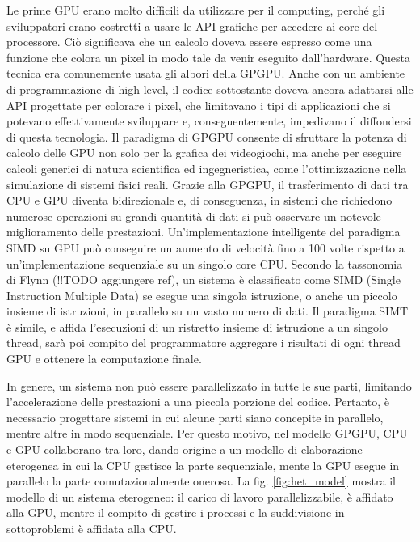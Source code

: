 Le prime GPU erano molto difficili da utilizzare per il computing, perché gli sviluppatori erano costretti a usare le API grafiche per accedere ai core del processore. Ciò significava che un calcolo doveva essere espresso come una funzione che colora un pixel in modo tale da venir eseguito dall'hardware. Questa tecnica era comunemente usata gli albori della GPGPU. Anche con un ambiente di programmazione di high level, il codice sottostante doveva ancora adattarsi alle API progettate per colorare i pixel, che limitavano i tipi di applicazioni che si potevano effettivamente sviluppare e, conseguentemente, impedivano il diffondersi di questa tecnologia.
Il paradigma di GPGPU consente di sfruttare la potenza di calcolo delle GPU non solo per la grafica dei videogiochi, ma anche per eseguire calcoli generici di natura scientifica ed ingegneristica, come l'ottimizzazione nella simulazione di sistemi fisici reali. Grazie alla GPGPU, il trasferimento di dati tra CPU e GPU diventa bidirezionale e, di conseguenza, in sistemi che richiedono numerose operazioni su grandi quantità di dati si può osservare un notevole miglioramento delle prestazioni. Un'implementazione intelligente del paradigma SIMD su GPU può conseguire un aumento di velocità fino a 100 volte rispetto a un'implementazione sequenziale su un singolo core CPU. Secondo la tassonomia di Flynn (!!TODO aggiungere ref), un sistema è classificato come SIMD (Single Instruction Multiple Data) se esegue una singola istruzione, o anche un piccolo insieme di istruzioni, in parallelo su un vasto numero di dati. Il paradigma SIMT è simile, e affida l'esecuzioni di un ristretto insieme di istruzione a un singolo thread, sarà poi compito del programmatore aggregare i risultati di ogni thread GPU e ottenere la computazione finale.

In genere, un sistema non può essere parallelizzato in tutte le sue parti, limitando l'accelerazione delle prestazioni a una piccola porzione del codice. Pertanto, è necessario progettare sistemi in cui alcune parti siano concepite in parallelo, mentre altre in modo sequenziale. Per questo motivo, nel modello GPGPU, CPU e GPU collaborano tra loro, dando origine a un modello di elaborazione eterogenea in cui la CPU gestisce la parte sequenziale, mente la GPU esegue in parallelo la parte comutazionalmente onerosa.
La fig. \ref{fig:het_model} mostra il modello di un sistema eterogeneo: il carico di lavoro parallelizzabile, è affidato alla GPU, mentre il compito di gestire i processi e la suddivisione in sottoproblemi è affidata alla CPU.

